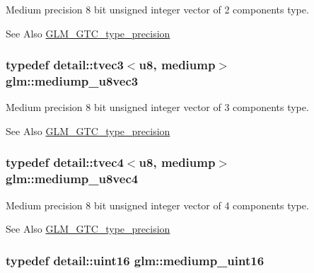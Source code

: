 Medium precision 8 bit unsigned integer vector of 2 components type. \begin{DoxySeeAlso}{See Also}
\hyperlink{group__gtc__type__precision}{G\-L\-M\-\_\-\-G\-T\-C\-\_\-type\-\_\-precision} 
\end{DoxySeeAlso}
\hypertarget{group__gtc__type__precision_ga58f79eee840b2838443292c50ddb2919}{
\subsubsection[{mediump\-\_\-u8vec3}]{\setlength{\rightskip}{0pt plus 5cm}typedef detail\-::tvec3$<$u8, mediump$>$ {\bf glm\-::mediump\-\_\-u8vec3}}}\label{group__gtc__type__precision_ga58f79eee840b2838443292c50ddb2919}
Medium precision 8 bit unsigned integer vector of 3 components type. \begin{DoxySeeAlso}{See Also}
\hyperlink{group__gtc__type__precision}{G\-L\-M\-\_\-\-G\-T\-C\-\_\-type\-\_\-precision} 
\end{DoxySeeAlso}
\hypertarget{group__gtc__type__precision_ga407b5aa9a3fd6d344b70fa6ce2ce92d4}{
\subsubsection[{mediump\-\_\-u8vec4}]{\setlength{\rightskip}{0pt plus 5cm}typedef detail\-::tvec4$<$u8, mediump$>$ {\bf glm\-::mediump\-\_\-u8vec4}}}\label{group__gtc__type__precision_ga407b5aa9a3fd6d344b70fa6ce2ce92d4}
Medium precision 8 bit unsigned integer vector of 4 components type. \begin{DoxySeeAlso}{See Also}
\hyperlink{group__gtc__type__precision}{G\-L\-M\-\_\-\-G\-T\-C\-\_\-type\-\_\-precision} 
\end{DoxySeeAlso}
\hypertarget{group__gtc__type__precision_ga2cef3a0d7b0fce75c9885f64656d8933}{
\subsubsection[{mediump\-\_\-uint16}]{\setlength{\rightskip}{0pt plus 5cm}typedef detail\-::uint16 {\bf glm\-::mediump\-\_\-uint16}}}\label{group__gtc__type__precision_ga2cef3a0d7b0fce75c9885f64656d8933}
